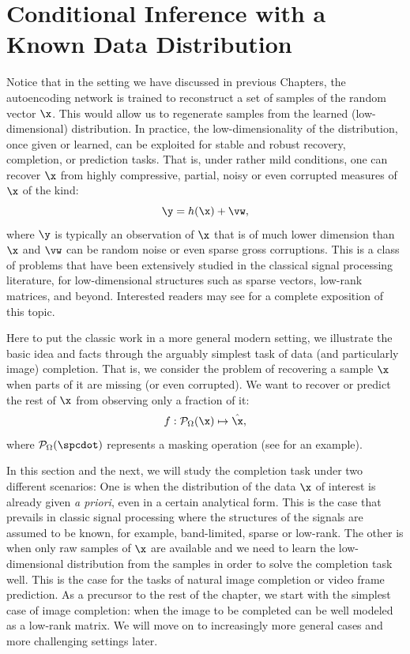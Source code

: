 \documentclass[../../book-main.tex]{subfiles}
\begin{document}
\section{Conditional Inference with a Known Data Distribution}
Notice that in the setting we have discussed in previous Chapters, the
autoencoding network is trained to reconstruct a set of samples of
the random vector $\x$. This would allow us to regenerate samples
from the learned (low-dimensional) distribution. In practice, the
low-dimensionality of the distribution, once given or learned, can be
exploited for stable and robust recovery, completion, or prediction
tasks. That is, under rather mild conditions, one can recover $\x$
from highly compressive, partial, noisy or even corrupted measures of
$\x$ of the kind:
\begin{equation}
    \y = h(\x) + \vw,
\end{equation}
where $\y$ is typically an observation of $\x$ that is of much lower
dimension than $\x$ and $\vw$ can be random noise or even sparse
gross corruptions. This is a class of problems that have been
extensively studied in the classical signal processing literature,
for low-dimensional structures such as sparse vectors, low-rank
matrices, and beyond. Interested readers may see
\cite{Wright-Ma-2022} for a complete exposition of this topic.

Here to put the classic work in a more general modern setting, we
illustrate the basic idea and facts through the arguably simplest
task of data (and particularly image) completion. That is, we
consider the problem of recovering a sample $\x$ when parts of it are
missing (or even corrupted). We want to recover or predict the rest of $\x$
from observing only a fraction of it:
\begin{equation}
    f: \mathcal{P}_{\Omega}(\x) \mapsto \hat{\x},
\end{equation}
where $\mathcal{P}_{\Omega}(\spcdot)$ represents a masking operation
(see  for an example).

In this section and the next, we will study the completion task under
two different scenarios: One is when the distribution of the data
$\x$ of interest is already given {\em a priori}, even in a certain
analytical form. This is the case that prevails in classic signal
processing where the structures of the signals are assumed to be
known, for example,  band-limited, sparse or low-rank. The other is
when only raw samples of $\x$ are available and we need to learn the
low-dimensional distribution from the samples in order to solve the
completion task well. This is the case for the tasks of natural image
completion or video frame prediction. As a precursor to the rest of
the chapter, we start with the simplest case of image completion:
when the image to be completed can be well modeled as a low-rank
matrix. We will move on to increasingly more general cases and more
challenging settings later.
\end{document}
